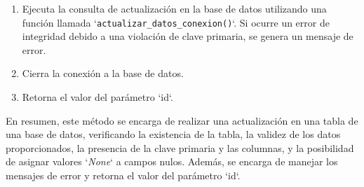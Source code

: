 \documentclass[12pt]{report}
\begin{document}
\begin{itemize}
\begin{enumerate}
    \item Ejecuta la consulta de actualización en la base de datos utilizando una función llamada `\texttt{actualizar\_datos\_conexion()}`. Si ocurre un error de integridad debido a una violación de clave primaria, se genera un mensaje de error.
    \item Cierra la conexión a la base de datos.
    \item Retorna el valor del parámetro `id`.
\end{enumerate}

En resumen, este método se encarga de realizar una actualización en una tabla de una base de datos, verificando la existencia de la tabla, la validez de los datos proporcionados, la presencia de la clave primaria y las columnas, y la posibilidad de asignar valores `\textit{None}` a campos nulos. Además, se encarga de manejar los mensajes de error y retorna el valor del parámetro `id`.
\end{itemize}
\end{document}
